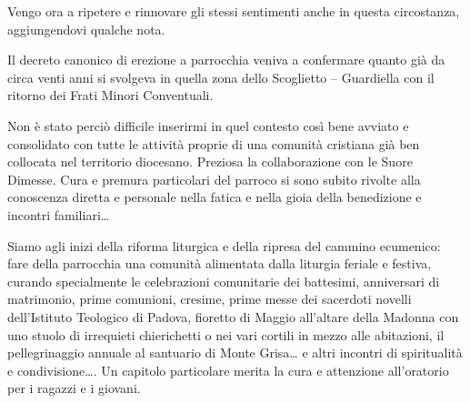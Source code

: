 \bigbreak

Vengo ora a ripetere e rinnovare gli stessi sentimenti anche in questa circostanza, aggiungendovi qualche nota. 

Il decreto canonico di erezione a parrocchia veniva a confermare quanto già da circa venti anni si svolgeva in quella zona dello Scoglietto – Guardiella con il ritorno dei Frati Minori Conventuali. 

Non è stato perciò difficile inserirmi in quel contesto così bene avviato e consolidato con tutte le attività proprie di una comunità cristiana già ben collocata nel territorio diocesano. Preziosa la collaborazione con le Suore Dimesse. Cura e premura particolari del parroco si sono subito rivolte alla conoscenza diretta e personale nella fatica e nella gioia della benedizione e incontri familiari… 

Siamo agli inizi della riforma liturgica e della ripresa del cammino ecumenico: fare della parrocchia una comunità alimentata dalla liturgia feriale e festiva, curando specialmente le celebrazioni comunitarie dei battesimi, anniversari di matrimonio, prime comunioni, cresime, prime messe dei sacerdoti novelli dell’Istituto Teologico di Padova, fioretto di Maggio all’altare della Madonna con uno stuolo di irrequieti chierichetti o nei vari cortili in mezzo alle abitazioni, il pellegrinaggio annuale al santuario di Monte Grisa… e altri incontri di spiritualità e condivisione…. Un capitolo particolare merita la cura e attenzione all’oratorio per i ragazzi e i giovani. 

